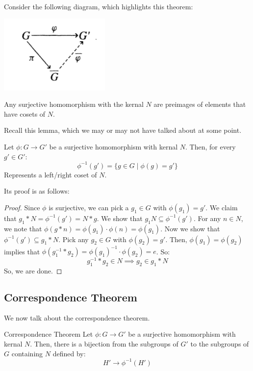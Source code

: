 \documentclass[letterpaper]{article}
\begin{document}
Consider the following diagram, which highlights this theorem: 
\begin{center}
    \includegraphics[scale=0.9]{assets/first_iso.png}
\end{center}
Any surjective homomorphism with the kernal $N$ are preimages of elements that have cosets of $N$.

\bigskip 

Recall this lemma, which we may or may not have talked about at some point. 
\begin{lemma}{}{}
    Let $\phi: G \to G'$ be a surjective homomorphism with kernal $N$. Then, for every $g' \in G'$: 
    \[\phi^{-1}(g') = \{g \in G \mid \phi(g) = g'\}\]
    Represents a left/right coset of $N$. 
\end{lemma}
Its proof is as follows: 
\begin{mdframed}
    \begin{proof}
        Since $\phi$ is surjective, we can pick a $g_1 \in G$ with $\phi(g_1) = g'$. We claim that $g_1 * N = \phi^{-1}(g') = N * g$. We show that $g_1 N \subseteq \phi^{-1}(g')$. For any $n \in N$, we note that $\phi(g * n) = \phi(g_1) \cdot \phi(n) = \phi(g_1)$. Now we show that $\phi^{-1}(g') \subseteq g_1 * N$. Pick any $g_2 \in G$ with $\phi(g_2) = g'$. Then, $\phi(g_1) = \phi(g_2)$ implies that $\phi(g_{1}^{-1} * g_2) = \phi(g_1)^{-1} \cdot \phi(g_2) = e$. So:
        \[g_{1}^{-1} * g_2 \in N \implies g_2 \in g_1 * N\]
        So, we are done.  
    \end{proof}
\end{mdframed}

\subsection{Correspondence Theorem}
We now talk about the correspondence theorem.
\begin{theorem}{Correspondence Theorem}{}
    Let $\phi: G \to G'$ be a surjective homomorphism with kernal $N$. Then, there is a bijection from the subgroups of $G'$ to the subgroups of $G$ containing $N$ defined by: 
    \[H' \to \phi^{-1}(H')\]
\end{theorem}
\end{document}
